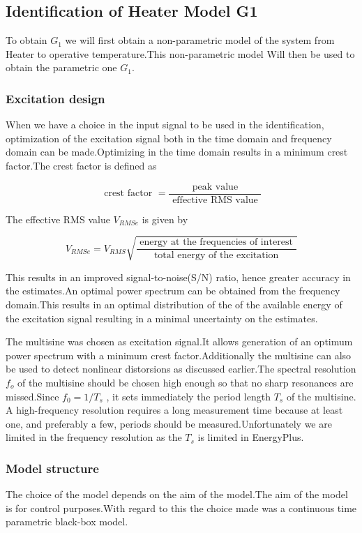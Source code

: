 \documentclass[a4paper,12pt]{article}
\numberwithin{equation}{section}
\begin{document}
\subsection{Identification of Heater Model G1}
To obtain $G_{1}$ we will first obtain a non-parametric model of the system from Heater to operative temperature.This non-parametric model Will then be used to obtain the parametric one $G_{1}$.

\subsubsection{ Excitation design }
When we have a choice in the input signal to be used in the identification, optimization of the excitation signal both in the time domain and frequency domain can be made.Optimizing in the time domain results in a minimum crest factor.The crest factor is defined as

$$
\text { crest factor }=\frac{\text { peak value }}{\text { effective RMS value }}
$$

The effective RMS value $V_{RMSe}$ is given by

$$
V_{R M S e}=V_{R M S} \sqrt{\frac{\text { energy at the frequencies of interest }}{\text { total energy of the excitation }}}
$$

\noindent
This results in an improved signal-to-noise(S/N) ratio, hence greater accuracy in the estimates.An optimal power spectrum can be obtained from the frequency domain.This results in an optimal distribution of the of the available energy of the excitation signal resulting in a minimal uncertainty on the estimates.

The multisine was chosen as excitation signal.It allows generation of an optimum power spectrum with a minimum crest factor.Additionally the multisine can also be used to detect nonlinear distorsions as discussed earlier.The spectral resolution $f_{o}$ of the multisine should be chosen high enough so that no sharp resonances are missed.Since $f_{0}=1 / T_{s}$ , it sets immediately the period length $T_{s}$ of the multisine. A high-frequency resolution requires a long measurement time because at least one, and preferably a few, periods should be measured.Unfortunately we are limited in the frequency resolution as the $T_{s}$ is limited in EnergyPlus.

\subsubsection{ Model structure }
The choice of the model depends on the aim of the model.The aim of the model is for control purposes.With regard to this the choice made was a continuous time parametric black-box model.
\end{document}
